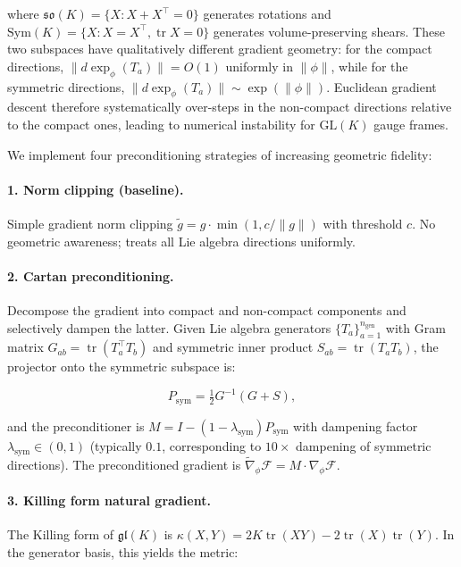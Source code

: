 \documentclass[twoside,11pt]{article}
\begin{document}
where $\mathfrak{so}(K) = \{X : X + X^\top = 0\}$ generates rotations and $\mathrm{Sym}(K) = \{X : X = X^\top, \operatorname{tr} X = 0\}$ generates volume-preserving shears. These two subspaces have qualitatively different gradient geometry: for the compact directions, $\|d\exp_\phi(T_a)\| = O(1)$ uniformly in $\|\phi\|$, while for the symmetric directions, $\|d\exp_\phi(T_a)\| \sim \exp(\|\phi\|)$. Euclidean gradient descent therefore systematically over-steps in the non-compact directions relative to the compact ones, leading to numerical instability for $\mathrm{GL}(K)$ gauge frames.

We implement four preconditioning strategies of increasing geometric fidelity:

\paragraph{1. Norm clipping (baseline).}
Simple gradient norm clipping $\tilde{g} = g \cdot \min(1, c/\|g\|)$ with threshold $c$. No geometric awareness; treats all Lie algebra directions uniformly.

\paragraph{2. Cartan preconditioning.}
Decompose the gradient into compact and non-compact components and selectively dampen the latter. Given Lie algebra generators $\{T_a\}_{a=1}^{n_{\mathrm{gen}}}$ with Gram matrix $G_{ab} = \operatorname{tr}(T_a^\top T_b)$ and symmetric inner product $S_{ab} = \operatorname{tr}(T_a T_b)$, the projector onto the symmetric subspace is:

\begin{equation}
P_{\mathrm{sym}} = \tfrac{1}{2}G^{-1}(G + S),
\end{equation}

and the preconditioner is $M = I - (1 - \lambda_{\mathrm{sym}}) P_{\mathrm{sym}}$ with dampening factor $\lambda_{\mathrm{sym}} \in (0, 1)$ (typically $0.1$, corresponding to $10\times$ dampening of symmetric directions). The preconditioned gradient is $\tilde{\nabla}_\phi \mathcal{F} = M \cdot \nabla_\phi \mathcal{F}$.

\paragraph{3. Killing form natural gradient.}
The Killing form of $\mathfrak{gl}(K)$ is $\kappa(X, Y) = 2K \operatorname{tr}(XY) - 2\operatorname{tr}(X)\operatorname{tr}(Y)$. In the generator basis, this yields the metric:
\end{document}
